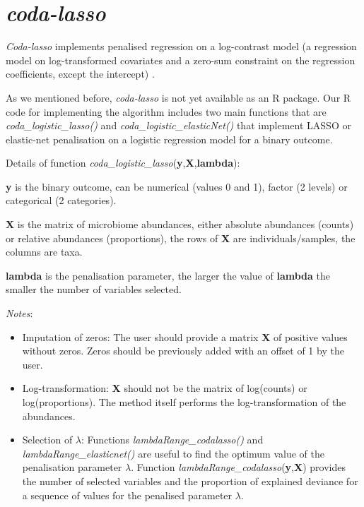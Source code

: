 \documentclass[openany]{book}
\providecommand{\tightlist}{%
  \setlength{\itemsep}{0pt}\setlength{\parskip}{0pt}}
\begin{document}
\chapter{\texorpdfstring{\emph{coda-lasso}}{coda-lasso}}\label{coda}

\emph{Coda-lasso} implements penalised regression on a log-contrast
model (a regression model on log-transformed covariates and a zero-sum
constraint on the regression coefficients, except the intercept)
\citep{lu2019generalized, lin2014variable}.

As we mentioned before, \emph{coda-lasso} is not yet available as an R
package. Our R code for implementing the algorithm includes two main
functions that are \emph{coda\_logistic\_lasso()} and
\emph{coda\_logistic\_elasticNet()} that implement LASSO or elastic-net
penalisation on a logistic regression model for a binary outcome.

Details of function
\emph{coda\_logistic\_lasso}(\textbf{y},\textbf{X},\textbf{lambda}):

\textbf{y} is the binary outcome, can be numerical (values 0 and 1),
factor (2 levels) or categorical (2 categories).

\textbf{X} is the matrix of microbiome abundances, either absolute
abundances (counts) or relative abundances (proportions), the rows of
\textbf{X} are individuals/samples, the columns are taxa.

\textbf{lambda} is the penalisation parameter, the larger the value of
\textbf{lambda} the smaller the number of variables selected.

\emph{Notes}:

\begin{itemize}
\tightlist
\item
  Imputation of zeros: The user should provide a matrix \textbf{X} of
  positive values without zeros. Zeros should be previously added with
  an offset of 1 by the user.
\item
  Log-transformation: \textbf{X} should not be the matrix of log(counts)
  or log(proportions). The method itself performs the log-transformation
  of the abundances.
\item
  Selection of \(\lambda\): Functions \emph{lambdaRange\_codalasso()}
  and \emph{lambdaRange\_elasticnet()} are useful to find the optimum
  value of the penalisation parameter \(\lambda\). Function
  \emph{lambdaRange\_codalasso}(\textbf{y},\textbf{X}) provides the
  number of selected variables and the proportion of explained deviance
  for a sequence of values for the penalised parameter \(\lambda\).
\end{itemize}
\end{document}
